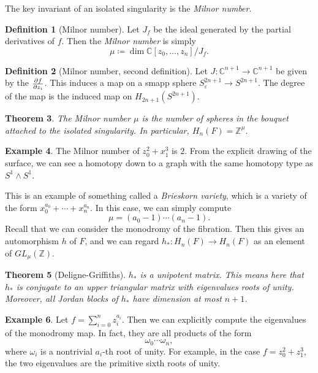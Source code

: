 \documentclass[leqno, openany]{memoir}
\newtheorem{thm}{Theorem}[chapter]
\theoremstyle{definition}
\newtheorem{defn}[thm]{Definition}
\newtheorem{exm}[thm]{Example}
\theoremstyle{remark}
\theoremstyle{plain}
\theoremstyle{definition}
\theoremstyle{remark}
\newcommand{\C}{\mathbb{C}}
\newcommand{\Z}{\mathbb{Z}}
\newcommand{\ep}{\varepsilon}
\begin{document}
The key invariant of an isolated singularity is the \textit{Milnor number}.
\begin{defn}[Milnor number] Let $J_f$ be the ideal generated by the partial
    derivatives of $f$. Then the \textit{Milnor number} is simply \[ \mu
    \coloneqq \dim \C[z_0, \ldots, z_n]/J_f. \] \end{defn}

\begin{defn}[Milnor number, second definition] Let $J: \C^{n+1} \to \C^{n+1}$
    be given by the $\pdv{f}{z_i}$. This induces a map on a smapp sphere
    $S_{\ep}^{2n+1} \to S^{2n+1}$. The degree of the map is the induced map on
    $H_{2n+1}(S^{2n+1})$.  \end{defn}

\begin{thm} The Milnor number $\mu$ is the number of spheres in the bouquet
attached to the isolated singularity. In particular, $H_n(F) = \Z^{\mu}$.
\end{thm}

\begin{exm} The Milnor number of $z_0^2 + x_1^3$ is $2$. From the explicit
drawing of the surface, we can see a homotopy down to a graph with the same
homotopy type as $S^1 \wedge S^1$.  \end{exm}

This is an example of something called a \textit{Brieskorn variety}, which is a
variety of the form $x_0^{a_0} + \cdots + x_n^{a_n}$. In this case, we can
simply compute \[ \mu = (a_0 - 1) \cdots (a_n - 1). \] Recall that we can
consider the monodromy of the fibration. Then this gives an automorphism $h$ of
$F$, and we can regard $h_*: H_n(F) \to H_n(F)$ as an element of
$GL_{\mu}(\Z)$.

\begin{thm}[Deligne-Griffiths] $h_*$ is a unipotent matrix. This means here
that $h_*$ is conjugate to an upper triangular matrix with eigenvalues roots of
unity. Moreover, all Jordan blocks of $h_*$ have dimension at most $n+1$.
\end{thm}

\begin{exm} Let $f = \sum_{i=0}^n z_i^{a_i}$. Then we can explicitly compute
    the eigenvalues of the monodromy map. In fact, they are all products of the
    form \[ \omega_0 \cdots \omega_n, \] where $\omega_i$ is a nontrivial
    $a_i$-th root of unity. For example, in the case $f = z_0^2 + z_1^3$, the
    two eigenvalues are the primitive sixth roots of unity.  \end{exm}
\end{document}
